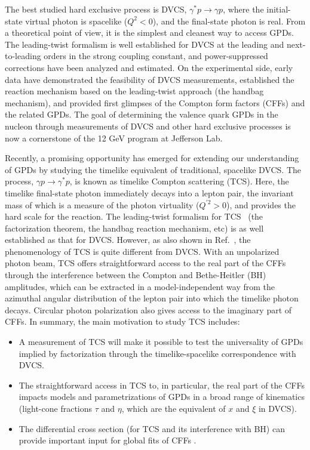 The best studied hard exclusive process is DVCS,
$\gamma^{\ast}p \to \gamma p$, where the initial-state virtual photon is
spacelike ($Q^2 < 0$), and the final-state photon is real. From a theoretical
point of view, it is the simplest and cleanest way to access GPDs.
The leading-twist formalism is well established for DVCS at the leading and
next-to-leading orders in the strong coupling constant, and power-suppressed
corrections have been analyzed and estimated. On the experimental side, early
data have demonstrated the feasibility of DVCS measurements, established the
reaction mechanism based on the leading-twist approach (the handbag
mechanism), and provided first glimpses of the Compton form factors (CFFs)
and the related GPDs. The goal of determining the valence quark GPDs in the
nucleon through measurements of DVCS and other hard exclusive processes is
now a cornerstone of the 12 GeV program at Jefferson Lab.

Recently, a promising opportunity has emerged for extending our understanding
of GPDs by studying the timelike equivalent of traditional, spacelike DVCS.
The process, $\gamma p \to \gamma^{\ast} p$, is known as timelike Compton
scattering (TCS). Here, the timelike final-state photon immediately decays
into a lepton pair, the invariant mass of which is a measure of the photon
virtuality ($Q^{\prime 2} > 0$), and provides the hard scale for the reaction.
The leading-twist formalism for TCS~\cite{Berger:2001xd} (the factorization
theorem, the handbag reaction mechanism, etc) is as well established as that
for DVCS. However, as also shown in Ref.~\cite{Berger:2001xd}, the
phenomenology of TCS is quite different from DVCS. With an unpolarized photon
beam, TCS offers straightforward access to the real part of the CFFs through
the interference between the Compton and Bethe-Heitler (BH) amplitudes, which
can be extracted in a model-independent way from the azimuthal angular
distribution of the lepton pair into which the timelike photon decays.
Circular photon polarization also gives access to the imaginary part of CFFs.
In summary, the main motivation to study TCS includes:
\begin{itemize}
\item
A measurement of TCS will make it possible to test the universality of GPDs
implied by factorization through the timelike-spacelike correspondence with
DVCS.
\item
The straightforward access in TCS to, in particular, the real part of the
CFFs impacts models and parametrizations of GPDs in a broad range of
kinematics (light-cone fractions $\tau$ and $\eta$, which are the equivalent
of $x$ and $\xi$ in DVCS).
\item
The differential cross section (for TCS and its interference with BH) can
provide important input for global fits of CFFs
\cite{Guidal:2013rya,Guidal:2008ie}.
\end{itemize}  

